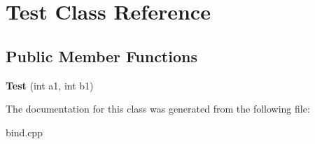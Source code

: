 \hypertarget{classTest}{}\section{Test Class Reference}
\label{classTest}
\subsection*{Public Member Functions}
\begin{DoxyCompactItemize}
\item 
{\bfseries Test} (int a1, int b1)\hypertarget{classTest_a0c5ee07b3605b673635e247e0d633383}{}\label{classTest_a0c5ee07b3605b673635e247e0d633383}

\end{DoxyCompactItemize}


The documentation for this class was generated from the following file\+:\begin{DoxyCompactItemize}
\item 
bind.\+cpp\end{DoxyCompactItemize}
